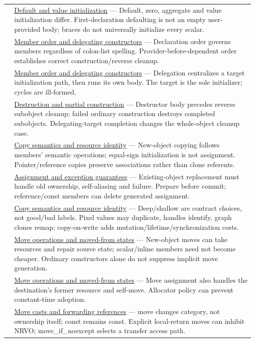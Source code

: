 {\begin{longtable}[]{@{}
  >{\raggedright\arraybackslash}p{}
  >{\raggedright\arraybackslash}p{}@{}}
133 & \hyperref[appendix-ba8c1a9fe03f]{Default and value initialization} --- Default, zero, aggregate and value initialization differ. First-declaration defaulting is not an empty user-provided body; braces do not universally initialize every scalar. \\
134 & \hyperref[appendix-3cb49709605a]{Member order and delegating constructors} --- Declaration order governs members regardless of colon-list spelling. Provider-before-dependent order establishes correct construction/reverse cleanup. \\
135 & \hyperref[appendix-3cb49709605a]{Member order and delegating constructors} --- Delegation centralizes a target initialization path, then runs its own body. The target is the sole initializer; cycles are ill-formed. \\
136 & \hyperref[appendix-9bfe377cef7a]{Destruction and partial construction} --- Destructor body precedes reverse subobject cleanup; failed ordinary construction destroys completed subobjects. Delegating-target completion changes the whole-object cleanup case. \\
137 & \hyperref[appendix-1340cd1ce582]{Copy semantics and resource identity} --- New-object copying follows members' semantic operations; equal-sign initialization is not assignment. Pointer/reference copies preserve associations rather than clone referents. \\
138 & \hyperref[appendix-bea6beb5350f]{Assignment and exception guarantees} --- Existing-object replacement must handle old ownership, self-aliasing and failure. Prepare before commit; reference/const members can delete generated assignment. \\
139 & \hyperref[appendix-1340cd1ce582]{Copy semantics and resource identity} --- Deep/shallow are contract choices, not good/bad labels. Pixel values may duplicate, handles identify, graph clones remap; copy-on-write adds mutation/lifetime/synchronization costs. \\
140 & \hyperref[appendix-5636651017c2]{Move operations and moved-from states} --- New-object moves can take resources and repair source state; scalar/inline members need not become cheaper. Ordinary constructors alone do not suppress implicit move generation. \\
141 & \hyperref[appendix-5636651017c2]{Move operations and moved-from states} --- Move assignment also handles the destination's former resource and self-move. Allocator policy can prevent constant-time adoption. \\
142 & \hyperref[appendix-0104b704fb11]{Move casts and forwarding references} --- move changes category, not ownership itself; const remains const. Explicit local-return moves can inhibit NRVO; move\_if\_noexcept selects a transfer access path. \\

\end{longtable}}
